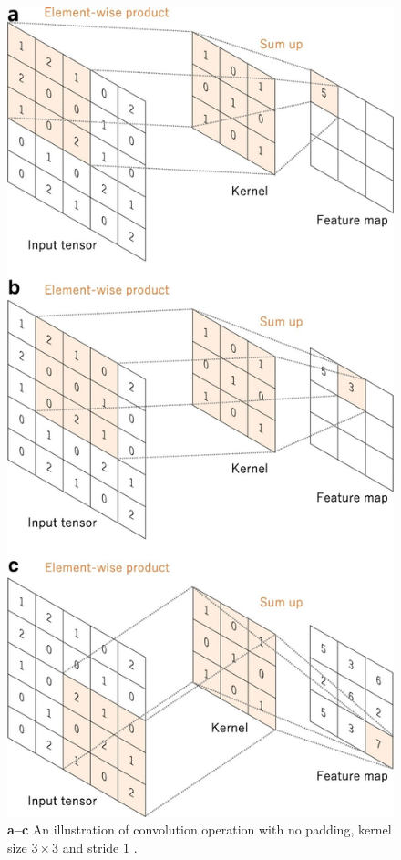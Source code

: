 \begin{figure}[H]
        \begin{center}
	    \includegraphics[scale=0.40]{images/Fundamentals/Convolution.JPG}
	    \caption[An illustration of Convolution Operation.]{\textbf{a–c} An illustration of convolution operation with no padding, kernel size $3 \times 3$ and stride $1$ \cite{articleCNNs}.}
	    
	    \label{fig:Convolution}
	    \end{center}
\end{figure}


